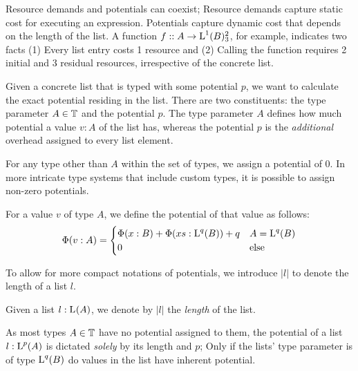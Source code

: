 \begin{remark}
   Resource demands and potentials can coexist; Resource demands capture static cost for executing an expression. Potentials capture dynamic cost that depends on the length of the list. A function \(f :: A \to \text{L}^{1}(B) ^{2}_{3}\), for example, indicates two facts (1) Every list entry costs 1 resource and (2) Calling the function requires 2 initial and 3 residual resources, irrespective of the concrete list.
\end{remark}

Given a concrete list that is typed with some potential \(p\), we want to calculate the exact potential residing in the list. There are two constituents: the type parameter \(A \in \mathbb{T}\) and the potential \(p\). The type parameter \(A\) defines how much potential a value \(v : A\) of the list has, whereas the potential \(p\) is the \emph{additional} overhead assigned to every list element.

For any type other than \(A\) within the set of types, we assign a potential of 0. In more intricate type systems that include custom types, it is possible to assign non-zero potentials. 

\begin{definition}\label{def:potential-function}
   For a value \(v\) of type \(A\), we define the potential of that value as follows:
   \[
      \Phi(v : A) = \begin{cases}
         \Phi(x : B) + \Phi(xs : \text{L}^{q}(B)) + q   & A = \text{L}^{q}(B)\\
         0                                            & \text{else}
      \end{cases}
   \]
\end{definition}

To allow for more compact notations of potentials, we introduce \(|l|\) to denote the length of a list \(l\). 

\begin{definition}\label{def:list-length}
   Given a list \(l : \text{L}^{}(A)\), we denote by \(|l|\) the \emph{length} of the list.
\end{definition}

As most types \(A \in \mathbb{T}\) have no potential assigned to them, the potential of a list \(l : \text{L}^{p}(A)\) is dictated \emph{solely} by its length and \(p\); Only if the lists' type parameter is of type \(\text{L}^{q}(B)\) do values in the list have inherent potential.

